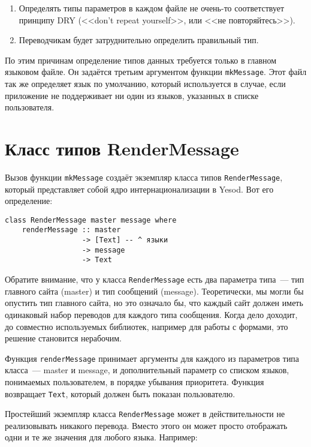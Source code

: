 \begin{enumerate}
  \item Определять типы параметров в каждом файле не очень-то соответствует
      принципу DRY (<<don't repeat yourself>>, или <<не повторяйтесь>>).

  \item Переводчикам будет затруднительно определить правильный тип.
\end{enumerate}

По этим причинам определение типов данных требуется только в главном языковом
файле. Он задаётся третьим аргументом функции \lstinline'mkMessage'. Этот файл
так же определяет язык по умолчанию, который используется в случае, если
приложение не поддерживает ни один из языков, указанных в списке пользователя.

\section{Класс типов RenderMessage}

Вызов функции \lstinline'mkMessage' создаёт экземпляр класса типов
\lstinline'RenderMessage', который представляет собой ядро интернационализации
в Yesod. Вот его определение:

\begin{lstlisting}
class RenderMessage master message where
    renderMessage :: master
                  -> [Text] -- ^ языки
                  -> message
                  -> Text
\end{lstlisting}

Обратите внимание, что у класса \lstinline'RenderMessage' есть два параметра
типа~--- тип главного сайта (master) и тип сообщений (message). Теоретически,
мы могли бы опустить тип главного сайта, но это означало бы, что каждый сайт
должен иметь одинаковый набор переводов для каждого типа сообщения. Когда дело
доходит, до совместно используемых библиотек, например для работы с формами,
это решение становится нерабочим.

Функция \lstinline'renderMessage' принимает аргументы для каждого из параметров
типа класса~--- master и message, и дополнительный параметр со списком языков,
понимаемых пользователем, в порядке убывания приоритета. Функция возвращает
\lstinline'Text', который должен быть показан пользователю.

Простейший экземпляр класса \lstinline'RenderMessage' может в действительности
не реализовывать никакого перевода. Вместо этого он может просто отображать
одни и те же значения для любого языка. Например:

